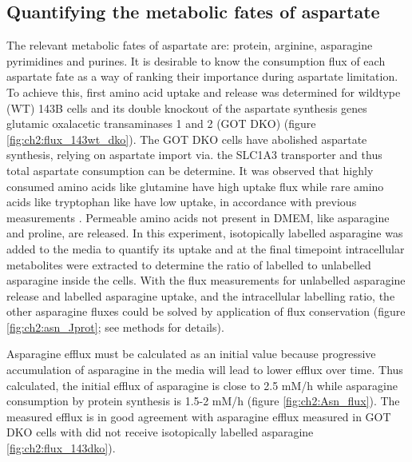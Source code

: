 \subsection{Quantifying the metabolic fates of aspartate}
The relevant metabolic fates of aspartate are: protein, arginine, asparagine pyrimidines and purines.
It is desirable to know the consumption flux of each aspartate fate as a way of ranking their importance during aspartate limitation.
To achieve this, first amino acid uptake and release was determined for wildtype (WT) 143B cells and its double knockout of the aspartate synthesis genes glutamic oxalacetic transaminases 1 and 2 (GOT DKO) (figure \ref{fig:ch2:flux_143wt_dko}).
The GOT DKO cells have abolished aspartate synthesis, relying on aspartate import via. the SLC1A3 transporter and thus total aspartate consumption can be determine.
It was observed that highly consumed amino acids like glutamine have high uptake flux while rare amino acids like tryptophan like have low uptake, in accordance with previous measurements \cite{Hosios2016-us}.
Permeable amino acids not present in DMEM, like asparagine and proline, are released.
In this experiment, isotopically labelled asparagine was added to the media to quantify its uptake and at the final timepoint intracellular metabolites were extracted to determine the ratio of labelled to unlabelled asparagine inside the cells.
With the flux measurements for unlabelled asparagine release and labelled asparagine uptake, and the intracellular labelling ratio, the other asparagine fluxes could be solved by application of flux conservation (figure \ref{fig:ch2:asn_Jprot}; see methods for details).

Asparagine efflux must be calculated as an initial value because progressive accumulation of asparagine in the media will lead to lower efflux over time.
Thus calculated, the initial efflux of asparagine is close to 2.5 mM/h while asparagine consumption by protein synthesis is 1.5-2 mM/h (figure \ref{fig:ch2:Asn_flux}).
The measured efflux is in good agreement with asparagine efflux measured in GOT DKO cells with did not receive isotopically labelled asparagine \ref{fig:ch2:flux_143dko}).


